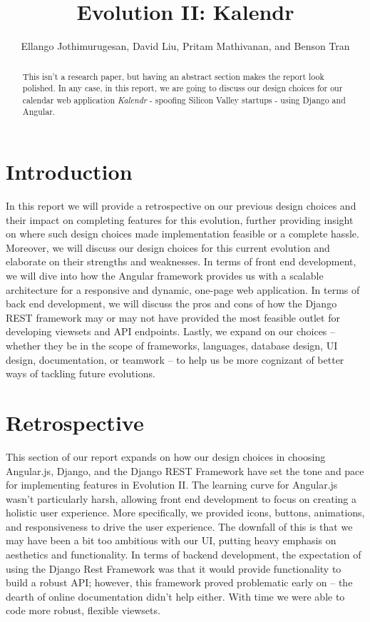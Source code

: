 \documentclass[a4paper]{article}
\title{Evolution II: Kalendr}
\author{Ellango Jothimurugesan, David Liu, Pritam Mathivanan, and Benson Tran}
\begin{document}
\maketitle

\begin{abstract}
This isn’t a research paper, but having an abstract section makes the report look polished. In any case, in this report, we are going to discuss our design choices for our calendar web application \textit{Kalendr} - spoofing Silicon Valley startups - using Django and Angular.
\end{abstract}

\section{Introduction}

In this report we will provide a retrospective on our previous design choices and their impact on completing features for this evolution, further providing insight on where such design choices made implementation feasible or a complete hassle. Moreover, we will discuss our design choices for this current evolution and elaborate on their strengths and weaknesses. In terms of front end development, we will dive into how the Angular framework provides us with a scalable architecture for a responsive and dynamic, one-page web application. In terms of back end development, we will discuss the pros and cons of how the Django REST framework may or may not have provided the most feasible outlet for developing viewsets and API endpoints. Lastly, we expand on our choices -- whether they be in the scope of frameworks, languages, database design, UI design, documentation, or teamwork -- to help us be more cognizant of better ways of tackling future evolutions.

\section{Retrospective}

This section of our report expands on how our design choices in choosing Angular.js, Django, and the Django REST Framework have set the tone and pace for implementing features in Evolution II. The learning curve for Angular.js wasn't particularly harsh, allowing front end development to focus on creating a holistic user experience. More specifically, we provided icons, buttons, animations, and responsiveness to drive the user experience. The downfall of this is that we may have been a bit too ambitious with our UI, putting heavy emphasis on aesthetics and functionality. In terms of backend development, the expectation of using the Django Rest Framework was that it would provide functionality to build a robust API; however, this framework proved problematic early on -- the dearth of online documentation didn't help either. With time we were able to code more robust, flexible viewsets.
\end{document}
